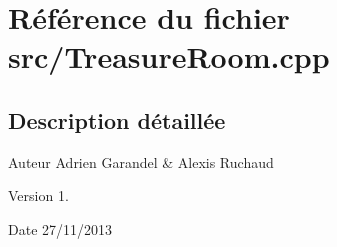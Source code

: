 \section{Référence du fichier src/\-Treasure\-Room.cpp}
\label{_treasure_room_8cpp}


\subsection{Description détaillée}
\begin{DoxyAuthor}{Auteur}
Adrien Garandel \& Alexis Ruchaud 
\end{DoxyAuthor}
\begin{DoxyVersion}{Version}
1. 
\end{DoxyVersion}
\begin{DoxyDate}{Date}
27/11/2013 
\end{DoxyDate}
